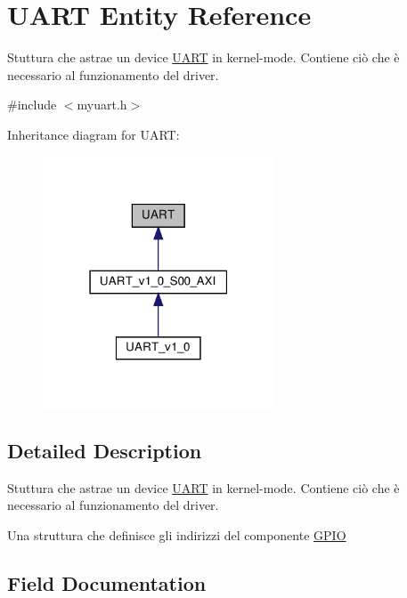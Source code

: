\hypertarget{structUART}{}\section{U\+A\+RT Entity Reference}
\label{structUART}


Stuttura che astrae un device \hyperlink{structUART}{U\+A\+RT} in kernel-\/mode. Contiene ciò che è necessario al funzionamento del driver.  




{\ttfamily \#include $<$myuart.\+h$>$}



Inheritance diagram for U\+A\+RT\+:\nopagebreak
\begin{figure}[H]
\begin{center}
\leavevmode
\includegraphics[width=195pt]{structUART__inherit__graph}
\end{center}
\end{figure}


\subsection{Detailed Description}
Stuttura che astrae un device \hyperlink{structUART}{U\+A\+RT} in kernel-\/mode. Contiene ciò che è necessario al funzionamento del driver. 

Una struttura che definisce gli indirizzi del componente \hyperlink{structGPIO}{G\+P\+IO} 

\subsection{Field Documentation}
\mbox{\label{structUART_ab50cdd3296629cf5c64dc386145fb2ee}} 
